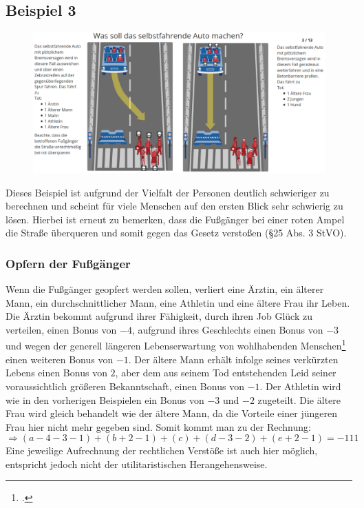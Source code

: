 \documentclass[a4paper, 12pt, openany]{book}
\begin{document}
            \subsection{Beispiel 3}
                \begin{figure}[h!]
                    \centering
                    \includegraphics[scale=0.4]{mm4.png} 
                    \caption{\cite{fig_moralmachine3}}
                    \label{fig_moralmachine3}
                \end{figure}
                Dieses Beispiel ist aufgrund der Vielfalt der Personen deutlich schwieriger zu berechnen und scheint für viele Menschen auf den ersten Blick sehr schwierig zu lösen. Hierbei ist erneut zu bemerken, dass die Fußgänger bei einer roten Ampel die Straße überqueren und somit gegen das Gesetz verstoßen (§25 Abs. 3 StVO).
                
                \subsubsection*{Opfern der Fußgänger}
                    Wenn die Fußgänger geopfert werden sollen, verliert eine Ärztin, ein älterer Mann, ein durchschnittlicher Mann, eine Athletin und eine ältere Frau ihr Leben. Die Ärztin bekommt aufgrund ihrer Fähigkeit, durch ihren Job Glück zu verteilen, einen Bonus von $-4$, aufgrund ihres Geschlechts einen Bonus von $-3$ und wegen der generell längeren Lebenserwartung von wohlhabenden Menschen\footcite[2]{lampert2014soziale} einen weiteren Bonus von $-1$. Der ältere Mann erhält infolge seines verkürzten Lebens einen Bonus von $2$, aber dem aus seinem Tod entstehenden Leid seiner voraussichtlich größeren Bekanntschaft, einen Bonus von $-1$. Der Athletin wird wie in den vorherigen Beispielen ein Bonus von $-3$ und $-2$ zugeteilt. Die ältere Frau wird gleich behandelt wie der ältere Mann, da die Vorteile einer jüngeren Frau hier nicht mehr gegeben sind. Somit kommt man zu der Rechnung:
                    $$\Rightarrow (a - 4 - 3 - 1) + (b + 2 - 1) + (c) + (d - 3 - 2) + (e + 2 - 1) = -111$$
                    Eine jeweilige Aufrechnung der rechtlichen Verstöße ist auch hier möglich, entspricht jedoch nicht der utilitaristischen Herangehensweise.
                    
\end{document}
